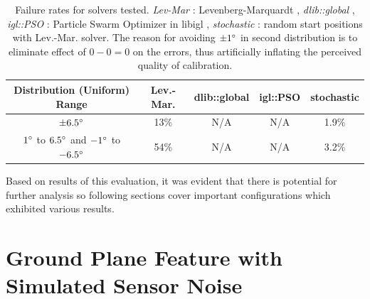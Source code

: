 \documentclass[english, printversion, nomenclature, notitle]{tuvisionthesis} %
\begin{document}
\begin{table}[]
	\centering
	\begin{tabular}{@{}ccccc@{}}
		\toprule
		Distribution (Uniform) Range & Lev.-Mar.  & dlib::global & igl::PSO & stochastic \\
		\midrule
		$\pm6.5\degree$& 13\% & N/A  & N/A & 1.9\% \\
		$1\degree$ to $6.5\degree$ and $-1\degree$ to $-6.5\degree$	& 54\% & N/A & N/A &3.2\% \\ \bottomrule
	\end{tabular}
	\caption[Failure rates for solvers tested.]{Failure rates for solvers tested. \textit{Lev-Mar} : Levenberg-Marquardt \cite{lev-mar, eigenweb}, \textit{dlib::global} \cite{dlib09}, \textit{igl::PSO} : Particle Swarm Optimizer in libigl  \cite{libigl}, \textit{stochastic} : random start positions with Lev.-Mar. solver. The reason for avoiding $\pm1\degree$ in second distribution is to eliminate effect of $0 - 0 = 0$ on the errors, thus artificially inflating the perceived quality of calibration.}
	\label{tab:initial}
\end{table}

\begin{center}
	\noindent{}
\end{center}

Based on results of this evaluation, it was evident that there is potential for further analysis so following sections cover important configurations which exhibited various results.

\section{Ground Plane Feature with Simulated Sensor Noise}
\label{sec:ground_plane_test}
\end{document}
